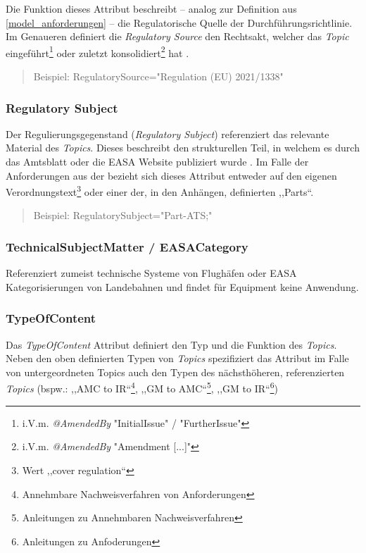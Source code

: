 Die Funktion dieses Attribut beschreibt -- analog zur Definition aus \ref{model_anforderungen} -- die Regulatorische Quelle der Durchführungsrichtlinie.
Im Genaueren definiert die \textit{Regulatory Source} den Rechtsakt, welcher das \textit{Topic} eingeführt\footnote{i.V.m. \textit{@AmendedBy} \textsf{"{}InitialIssue"} / "FurtherIssue"} oder zuletzt konsolidiert\footnote{i.V.m. \textit{@AmendedBy} \textsf{"{}Amendment [...]"}} hat \cite[27]{easa_xml_doc}. 

    \begin{quote}
    Beispiel:
    \textsf{RegulatorySource="{}Regulation (EU) 2021/1338"}
\end{quote}

    \subsubsection{Regulatory Subject}

Der Regulierungsgegenstand (\textit{Regulatory Subject}) referenziert das relevante Material des \textit{Topics}. 
Dieses beschreibt den strukturellen Teil, in welchem es durch das Amtsblatt oder die \ac{EASA} Website publiziert wurde \cite[28]{easa_xml_doc}.
Im Falle der \atmans Anforderungen aus der  bezieht sich dieses Attribut entweder auf den eigenen Verordnungstext\footnote{Wert ,,cover regulation``} oder einer der, in den Anhängen, definierten ,,Parts``.
\begin{quote}
    Beispiel:
    \textsf{RegulatorySubject="Part-ATS;"}
\end{quote}


    \subsubsection{TechnicalSubjectMatter / EASACategory}

Referenziert zumeist technische Systeme von Flughäfen oder \ac{EASA} Kategorisierungen von Landebahnen und findet für \atmans Equipment keine Anwendung. \cite[28--29, 31]{easa_xml_doc} 

   \pagebreak
    \subsubsection{TypeOfContent}

Das \textit{TypeOfContent} Attribut definiert den Typ und die Funktion des \textit{Topics}.
Neben den oben definierten Typen von \textit{Topics} spezifiziert das Attribut im Falle von untergeordneten Topics auch den Typen des nächsthöheren, referenzierten \textit{Topics} 
(bspw.: ,,AMC to IR``\footnote{Annehmbare Nachweisverfahren von Anforderungen}, ,,GM to AMC``\footnote{Anleitungen zu Annehmbaren Nachweisverfahren}, ,,GM to IR``\footnote{Anleitungen zu Anfoderungen})


